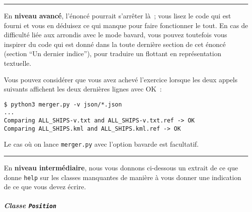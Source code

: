     \begin{center}\rule{0.5\linewidth}{\linethickness}\end{center}

    En \textbf{niveau avancé}, l'énoncé pourrait s'arrêter là~; vous lisez
le code qui est fourni et vous en déduisez ce qui manque pour faire
fonctionner le tout. En cas de difficulté liée aux arrondis avec le mode
bavard, vous pouvez toutefois vous inspirer du code qui est donné dans
la toute dernière section de cet énoncé (section ``Un dernier indice''),
pour traduire un flottant en représentation textuelle.

    Vous pouvez considérer que vous avez achevé l'exercice lorsque les deux
appels suivants affichent les deux dernières lignes avec OK~:

\begin{Shaded}
\begin{Highlighting}[frame=lines,framerule=0.6mm,rulecolor=\color{asisframecolor}]
\OperatorTok{/*}
\OperatorTok{->}
\OperatorTok{->}
\end{Highlighting}
\end{Shaded}

\begin{verbatim}
$ python3 merger.py -v json/*.json
...
Comparing ALL_SHIPS-v.txt and ALL_SHIPS-v.txt.ref -> OK
Comparing ALL_SHIPS.kml and ALL_SHIPS.kml.ref -> OK
\end{verbatim}

    Le cas où on lance \texttt{merger.py} avec l'option bavarde est
facultatif.

    \begin{center}\rule{0.5\linewidth}{\linethickness}\end{center}

    En \textbf{niveau intermédiaire}, nous vous donnons ci-dessous un
extrait de ce que donne \texttt{help} sur les classes manquantes de
manière à vous donner une indication de ce que vous devez écrire.

    \hypertarget{classe-position}{%
\subparagraph{\texorpdfstring{Classe
\texttt{Position}}{Classe Position}}\label{classe-position}}

